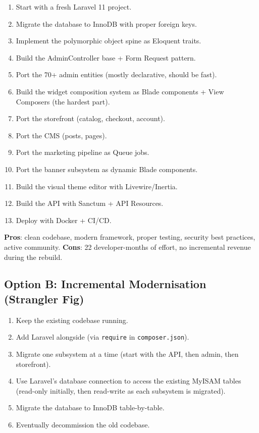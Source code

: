 \documentclass[11pt,a4paper]{article}
\begin{document}
\begin{enumerate}[leftmargin=1.6em,itemsep=2pt]
  \item Start with a fresh Laravel 11 project.
  \item Migrate the database to InnoDB with proper foreign keys.
  \item Implement the polymorphic object spine as Eloquent traits.
  \item Build the AdminController base + Form Request pattern.
  \item Port the 70+ admin entities (mostly declarative, should be fast).
  \item Build the widget composition system as Blade components + View
        Composers (the hardest part).
  \item Port the storefront (catalog, checkout, account).
  \item Port the CMS (posts, pages).
  \item Port the marketing pipeline as Queue jobs.
  \item Port the banner subsystem as dynamic Blade components.
  \item Build the visual theme editor with Livewire/Inertia.
  \item Build the API with Sanctum + API Resources.
  \item Deploy with Docker + CI/CD.
\end{enumerate}

\textbf{Pros}: clean codebase, modern framework, proper testing,
security best practices, active community.
\textbf{Cons}: 22 developer-months of effort, no incremental revenue
during the rebuild.

\subsection{Option B: Incremental Modernisation (Strangler Fig)}

\begin{enumerate}[leftmargin=1.6em,itemsep=2pt]
  \item Keep the existing codebase running.
  \item Add Laravel alongside (via \texttt{require} in
        \texttt{composer.json}).
  \item Migrate one subsystem at a time (start with the API, then
        admin, then storefront).
  \item Use Laravel's database connection to access the existing
        MyISAM tables (read-only initially, then read-write as each
        subsystem is migrated).
  \item Migrate the database to InnoDB table-by-table.
  \item Eventually decommission the old codebase.
\end{enumerate}
\end{document}
